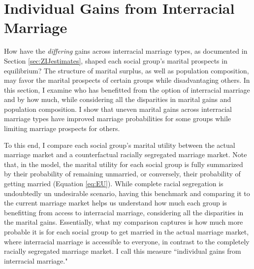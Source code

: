 



\section{Individual Gains from Interracial Marriage}  \label{sec:individualgains}


How have the \textit{differing} gains across interracial marriage types, as documented in Section \ref{sec:ZIJestimates}, shaped each social group's marital prospects in equilibrium? The structure of marital surplus, as well as population composition, may favor the marital prospects of certain groups while disadvantaging others. In this section, I examine who has benefitted from the option of interracial marriage and by how much, while considering all the disparities in marital gains and population composition. I show that uneven marital gains across interracial marriage types have improved marriage probabilities for some groups while limiting marriage prospects for others.

 To this end, I compare each social group's marital utility between the actual marriage market and a counterfactual racially segregated marriage market. Note that, in the model, the marital utility for each social group is fully summarized by their probability of remaining unmarried, or conversely, their probability of getting married (Equation \ref{eq:EU}). While complete racial segregation is undoubtedly un undesirable scenario, having this benchmark and comparing it to the current marriage market helps us understand how much each group is benefitting from access to interracial marriage, considering all the disparities in the marital gains. Essentially, what my comparison captures is how much more probable it is for each social group to get married in the actual marriage market, where interracial marriage is accessible to everyone, in contrast to the completely racially segregated marriage market. I call this measure ``individual gains from interracial marriage."

